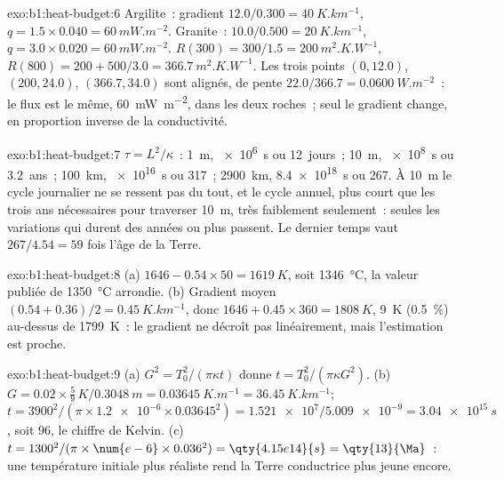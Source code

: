 \begin{solution}{exo:b1:heat-budget:6}
Argilite~: gradient $12.0/0.300 = \qty{40}{K.km^{-1}}$, $q = 1.5\times0.040 =
\qty{60}{mW.m^{-2}}$. Granite~: $10.0/0.500 = \qty{20}{K.km^{-1}}$,
$q = 3.0\times0.020 = \qty{60}{mW.m^{-2}}$. $R(300) = 300/1.5 =
\qty{200}{m^2.K.W^{-1}}$, $R(800) = 200 + 500/3.0 = \qty{366.7}{m^2.K.W^{-1}}$.
Les trois points $(0, 12.0)$, $(200, 24.0)$, $(366.7, 34.0)$ sont alignés, de
pente $22.0/366.7 = \qty{0.0600}{W.m^{-2}}$~: le flux est le même,
\qty{60}{mW.m^{-2}}, dans les deux roches~; seul le gradient change, en
proportion inverse de la conductivité.
\end{solution}

\begin{solution}{exo:b1:heat-budget:7}
$\tau = L^2/\kappa$~: \qty{1}{m}, \qty{e6}{s} ou \num{12}~jours~; \qty{10}{m},
\qty{e8}{s} ou \num{3.2}~ans~; \qty{100}{km}, \qty{e16}{s} ou
\qty{317}{\Ma}~; \qty{2900}{km}, \qty{8.4e18}{s} ou \qty{267}{\Ga}. À
\qty{10}{m} le cycle journalier ne se ressent pas du tout, et le cycle annuel,
plus court que les trois ans nécessaires pour traverser \qty{10}{m}, très
faiblement seulement~: seules les variations qui durent des années ou plus
passent. Le dernier temps vaut $267/4.54 = 59$ fois l'âge de la Terre.
\end{solution}

\begin{solution}{exo:b1:heat-budget:8}
(a) $1646 - 0.54\times50 = \qty{1619}{K}$, soit \qty{1346}{\degreeCelsius},
la valeur publiée de \qty{1350}{\degreeCelsius} arrondie. (b) Gradient moyen
$(0.54 + 0.36)/2 = \qty{0.45}{K.km^{-1}}$, donc $1646 + 0.45\times360 =
\qty{1808}{K}$, \qty{9}{K} (\qty{0.5}{\percent}) au-dessus de \qty{1799}{K}~: le
gradient ne décroît pas linéairement, mais l'estimation est proche.
\end{solution}

\begin{solution}{exo:b1:heat-budget:9}
(a) $G^2 = T_0^2/(\pi\kappa t)$ donne $t = T_0^2/(\pi\kappa G^2)$.
(b) $G = 0.02\times\tfrac59\,\unit{K}/\qty{0.3048}{m} = \qty{0.03645}{K.m^{-1}} =
\qty{36.45}{K.km^{-1}}$; $t = 3900^2/(\pi\times\num{1.2e-6}\times0.03645^2) =
\num{1.521e7}/\num{5.009e-9} = \qty{3.04e15}{s}$, soit \qty{96}{\Ma},
le chiffre de Kelvin. (c) $t = 1300^2/(\pi\times\num{e-6}\times0.036^2) =
\qty{4.15e14}{s} = \qty{13}{\Ma}$~: une température initiale plus réaliste rend la
Terre conductrice plus jeune encore.
\end{solution}

